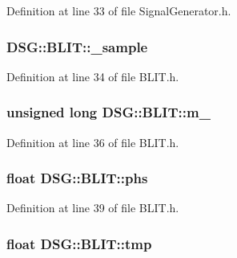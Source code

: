 Definition at line 33 of file Signal\+Generator.\+h.

\hypertarget{classDSG_1_1BLIT_a4fa5d5d8a8d5dd64e027067d0018570d}{
\subsubsection[{\+\_\+sample}]{ D\+S\+G\+::\+B\+L\+I\+T\+::\+\_\+sample\hspace{0.3cm}{\ttfamily [protected]}}}\label{classDSG_1_1BLIT_a4fa5d5d8a8d5dd64e027067d0018570d}


Definition at line 34 of file B\+L\+I\+T.\+h.

\hypertarget{classDSG_1_1BLIT_a93504a847d83314bbd9020750820242b}{
\subsubsection[{m\+\_\+}]{\setlength{\rightskip}{0pt plus 5cm}unsigned long D\+S\+G\+::\+B\+L\+I\+T\+::m\+\_\+\hspace{0.3cm}{\ttfamily [protected]}}}\label{classDSG_1_1BLIT_a93504a847d83314bbd9020750820242b}


Definition at line 36 of file B\+L\+I\+T.\+h.

\hypertarget{classDSG_1_1BLIT_a392dc88ed2691c6637a6afe8607881c6}{
\subsubsection[{phs}]{\setlength{\rightskip}{0pt plus 5cm}float D\+S\+G\+::\+B\+L\+I\+T\+::phs\hspace{0.3cm}{\ttfamily [protected]}}}\label{classDSG_1_1BLIT_a392dc88ed2691c6637a6afe8607881c6}


Definition at line 39 of file B\+L\+I\+T.\+h.

\hypertarget{classDSG_1_1BLIT_ac0570d5d963ca947e8860a547df7b9dc}{
\subsubsection[{tmp}]{\setlength{\rightskip}{0pt plus 5cm}float D\+S\+G\+::\+B\+L\+I\+T\+::tmp\hspace{0.3cm}{\ttfamily [protected]}}}\label{classDSG_1_1BLIT_ac0570d5d963ca947e8860a547df7b9dc}



